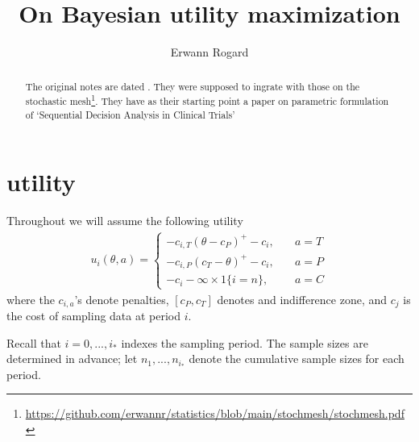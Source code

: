 \documentclass[11pt]{article}
\title{On Bayesian utility maximization}
\author{Erwann Rogard}
\date{\ThisDate}
\begin{document}
\maketitle

\begin{abstract}The original notes are dated . They were supposed to ingrate with those on the stochastic mesh\footnote{\url{https://github.com/erwannr/statistics/blob/main/stochmesh/stochmesh.pdf}}. They have as their starting point a paper on parametric formulation of `Sequential Decision Analysis in Clinical Trials'\cite{carlin1998}\end{abstract}

\section{utility}
Throughout we will assume the following utility
\begin{align}u_i(\theta,a)=\left\{
\begin{array}{ll}
-c_{i,T}(\theta-c_P)^{+}-c_i,&\quad a=T\\
-c_{i,P}(c_T-\theta)^{+}-c_i,&\quad a=P\\
-c_i-\infty \times 1\{i=n\},&\quad a=C
\end{array}\right.
\end{align}where the $c_{i,a}$'s denote penalties, $[c_P,c_T]$ denotes and indifference zone, and $c_j$ is the cost of sampling data at period $i$.

Recall that $i=0,...,i_*$ indexes the sampling period. The sample sizes are determined in advance; let $n_1,...,n_{i_*}$ denote the cumulative sample sizes for each period. 
\end{document}
